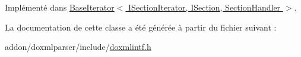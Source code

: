 Implémenté dans \hyperlink{class_base_iterator_a93b9aedc8f3aed39e3d2a0fa6d70240d}{Base\+Iterator$<$ I\+Section\+Iterator, I\+Section, Section\+Handler $>$}.



La documentation de cette classe a été générée à partir du fichier suivant \+:\begin{DoxyCompactItemize}
\item 
addon/doxmlparser/include/\hyperlink{include_2doxmlintf_8h}{doxmlintf.\+h}\end{DoxyCompactItemize}
